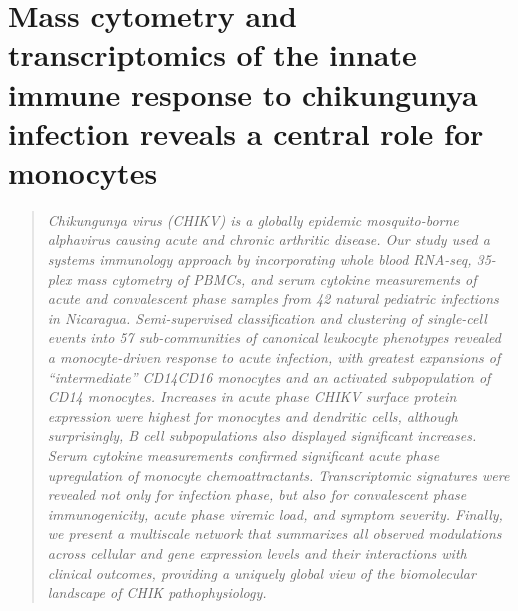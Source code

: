 
\chapter{Mass cytometry and transcriptomics of the innate immune response to chikungunya infection reveals a central role for monocytes}
\label{chap:chik}

\newcommand{\subcommunity}{sub-\allowbreak com\-mu\-ni\-ty}
\newcommand{\subcommunities}{sub-\allowbreak com\-mu\-ni\-ties}
\newcommand{\Subcommunities}{Sub-\allowbreak com\-mu\-ni\-ties}
\newcommand{\pertranscript}{per-\allowbreak trans\-cript}



\begin{quote}
\emph{Chikungunya virus (CHIKV) is a globally epidemic mosquito-borne alphavirus causing acute and chronic arthritic disease. Our study used a systems immunology approach by incorporating whole blood RNA-seq, 35-plex mass cytometry of PBMCs, and serum cytokine measurements of acute and convalescent phase samples from 42 natural pediatric infections in Nicaragua. Semi-supervised classification and clustering of single-cell events into 57 \subcommunities{} of canonical leukocyte phenotypes revealed a monocyte-driven response to acute infection, with greatest expansions of “intermediate” CD14\sups{++}\allowbreak CD16\sups{+} monocytes and an activated subpopulation of CD14\sups{+} monocytes. Increases in acute phase CHIKV surface protein expression were highest for monocytes and dendritic cells, although surprisingly, B cell subpopulations also displayed significant increases. Serum cytokine measurements confirmed significant acute phase upregulation of monocyte chemoattractants. Transcriptomic signatures were revealed not only for infection phase, but also for convalescent phase immunogenicity, acute phase viremic load, and symptom severity. Finally, we present a multiscale network that summarizes all observed modulations across cellular and gene expression levels and their interactions with clinical outcomes, providing a uniquely global view of the biomolecular landscape of CHIK pathophysiology.}
\end{quote}

